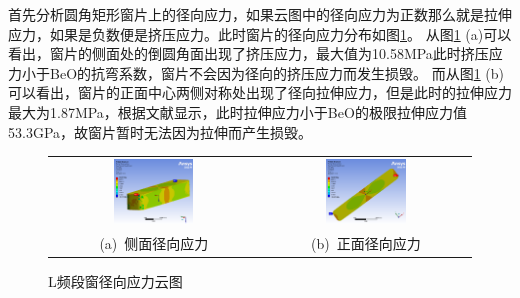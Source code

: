 \documentclass[master]{thesis-uestc}
\begin{document}
首先分析圆角矩形窗片上的径向应力，如果云图中的径向应力为正数那么就是拉伸应力，如果是负数便是挤压应力。此时窗片的径向应力分布如图\ref{fig:L频段窗径向应力}。
从图\ref{fig:L频段窗径向应力} (a)可以看出，窗片的侧面处的倒圆角面出现了挤压应力，最大值为10.58MPa此时挤压应力小于BeO的抗弯系数，窗片不会因为径向的挤压应力而发生损毁。
而从图\ref{fig:L频段窗径向应力} (b)可以看出，窗片的正面中心两侧对称处出现了径向拉伸应力，但是此时的拉伸应力最大为1.87MPa，根据文献\cite{mortazavi2021high}显示，此时拉伸应力小于BeO的极限拉伸应力值53.3GPa，故窗片暂时无法因为拉伸而产生损毁。
\begin{figure}[!htb]
    \small
    \centering
    \begin{tabular}{@{\ }c@{\ }c}
        \includegraphics[width=0.4\textwidth]{pic/chapter4/L径向应力侧面.png} & 
        \hspace{5pt}
        \includegraphics[width=0.4\textwidth]{pic/chapter4/L径向应力正面.png}     \\
        \mbox{\small (a) 侧面径向应力}                                                                               & 
        \mbox{\small (b) 正面径向应力}                                                                                  \\
    \end{tabular}
    \caption{L频段窗径向应力云图}
    \label{fig:L频段窗径向应力}
\end{figure}
\end{document}
